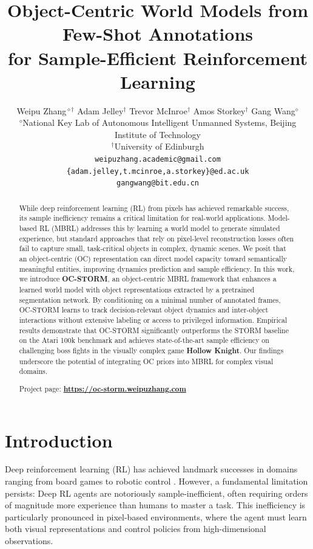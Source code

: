 \documentclass{article} %
\title{Object-Centric World Models from \\
Few-Shot Annotations \\
for Sample-Efficient Reinforcement Learning
}
\author{Weipu Zhang$^{\diamond\dagger}$\footnotemark[1]
\quad
Adam Jelley$^{\dagger}$
\quad
Trevor McInroe$^{\dagger}$
\quad
Amos Storkey$^{\dagger}$
\quad Gang Wang$^{\diamond}$\footnotemark[3]\\
$^{\diamond}$National Key Lab of Autonomous Intelligent Unmanned Systems, Beijing Institute of Technology\\
$^{\dagger}$University of Edinburgh\\
\texttt{weipuzhang.academic@gmail.com}\\
\texttt{\{adam.jelley,t.mcinroe,a.storkey\}@ed.ac.uk} \\
\texttt{gangwang@bit.edu.cn}
}
\begin{document}
\maketitle

\renewcommand{\thefootnote}{\fnsymbol{footnote}}

\begin{abstract}

While deep reinforcement learning (RL) from pixels has achieved remarkable success, its sample inefficiency remains a critical limitation for real-world applications. Model-based RL (MBRL) addresses this by learning a world model to generate simulated experience, but standard approaches that rely on pixel-level reconstruction losses often fail to capture small, task-critical objects in complex, dynamic scenes. We posit that an object-centric (OC) representation can direct model capacity toward semantically meaningful entities, improving dynamics prediction and sample efficiency. In this work, we introduce \textbf{OC-STORM}, an object-centric MBRL framework that enhances a learned world model with object representations extracted by a pretrained segmentation network. By conditioning on a minimal number of annotated frames, OC-STORM learns to track decision-relevant object dynamics and inter-object interactions without extensive labeling or access to privileged information. Empirical results demonstrate that OC-STORM significantly outperforms the STORM baseline on the Atari 100k benchmark and achieves state-of-the-art sample efficiency on challenging boss fights in the visually complex game \textbf{Hollow Knight}. Our findings underscore the potential of integrating OC priors into MBRL for complex visual domains.

Project page: \textbf{\textcolor{magenta}{\url{https://oc-storm.weipuzhang.com}}}
\end{abstract}

\section{Introduction} \label{sec:intro}

Deep reinforcement learning (RL) has achieved landmark successes in domains ranging from board games to robotic control \citep{silver_mastering_2016, mnih_human-level_2015, hafner_mastering_2023,feng2025multiagent}. However, a fundamental limitation persists: Deep RL agents are notoriously sample-inefficient, often requiring orders of magnitude more experience than humans to master a task. This inefficiency is particularly pronounced in pixel-based environments, where the agent must learn both visual representations and control policies from high-dimensional observations.
\end{document}
